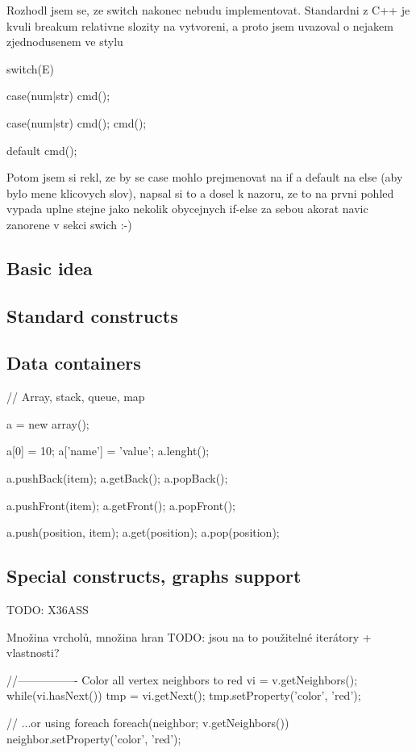 \documentclass[11pt,twoside,a4paper]{book}
\begin{document}
Rozhodl jsem se, ze switch nakonec nebudu implementovat. Standardni z C++ je kvuli breakum relativne slozity na vytvoreni, a proto jsem uvazoval o nejakem zjednodusenem ve stylu

switch(E)
{
	case(num|str)
		cmd();

	case(num|str)
	{
		cmd();
		cmd();
	}

	default
		cmd();
}

Potom jsem si rekl, ze by se case mohlo prejmenovat na if a default na else (aby bylo mene klicovych slov), napsal si to a dosel k nazoru, ze to na prvni pohled vypada uplne stejne jako nekolik obycejnych if-else za sebou akorat navic zanorene v sekci swich :-)

\subsection{Basic idea}

\subsection{Standard constructs}

\subsection{Data containers}

// Array, stack, queue, map

a = new array();

a[0] = 10;
a['name'] = 'value';
a.lenght();

a.pushBack(item);
a.getBack();
a.popBack();

a.pushFront(item);
a.getFront();
a.popFront();

a.push(position, item);
a.get(position);
a.pop(position);

\subsection{Special constructs, graphs support}

TODO: X36ASS

Množina vrcholů, množina hran
	TODO: jsou na to použitelné iterátory + vlastnosti?

//---------------- Color all vertex neighbors to red
vi = v.getNeighbors();
while(vi.hasNext())
{
	tmp = vi.getNext();
	tmp.setProperty('color', 'red');
}

// ...or using foreach
foreach(neighbor; v.getNeighbors())
	neighbor.setProperty('color', 'red');
\end{document}
